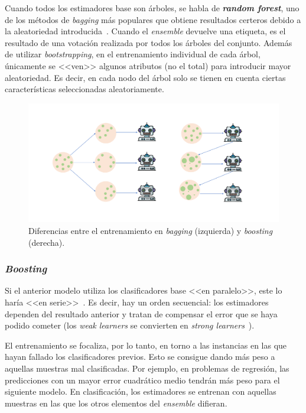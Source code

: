 Cuando todos los estimadores base son árboles, se habla de \textbf{\textit{random forest}}, uno de los métodos de \textit{bagging} más populares que obtiene resultados certeros debido a la aleatoriedad introducida~\cite{originalCoForest2007}. Cuando el \textit{ensemble} devuelve una etiqueta, es el resultado de una votación realizada por todos los árboles del conjunto. Además de utilizar \textit{bootstrapping}, en el entrenamiento individual de cada árbol, únicamente se <<ven>> algunos atributos (no el total) para introducir mayor aleatoriedad. Es decir, en cada nodo del árbol solo se tienen en cuenta ciertas características seleccionadas aleatoriamente.

\begin{figure}[h]
	\caption[Entrenamiento \textit{bagging} y \textit{boosting}]{Diferencias entre el entrenamiento en \textit{bagging} (izquierda) y \textit{boosting} (derecha).}
	\label{img:bagging}
	\centering
	\includegraphics[width=\textwidth]{../img/memoria/3_bagging_boosting.pdf}
\end{figure}
	
\subsubsection{\textit{Boosting}}

Si el anterior modelo utiliza los clasificadores base <<en paralelo>>, este lo haría <<en serie>>~\cite{engelen2018thesis}. Es decir, hay un orden secuencial: los estimadores dependen del resultado anterior y tratan de compensar el error que se haya podido cometer (los \textit{weak learners} se convierten en \textit{strong learners}~\cite{ensembles2006robi}).

El entrenamiento se focaliza, por lo tanto, en torno a las instancias en las que hayan fallado los clasificadores previos. Esto se consigue dando más peso a aquellas muestras mal clasificadas. Por ejemplo, en problemas de regresión, las predicciones con un mayor error cuadrático medio tendrán más peso para el siguiente modelo. En clasificación, los estimadores se entrenan con aquellas muestras en las que los otros elementos del \textit{ensemble} difieran.

